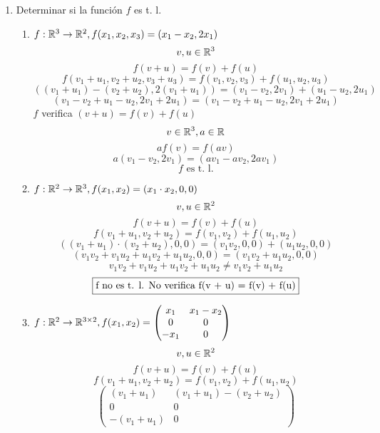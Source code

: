 \documentclass[../practica.root.tex]{subfiles}
\begin{document}
\begin{enumerate}
    \item Determinar si la función $f$ es t. l.
          \begin{enumerate}
              \item \( f: \mathbb{R}^3 \to \mathbb{R}^2, f(x_1, x_2, x_3) = (x_1 - x_2, 2x_1) \)
                    \[ v, u \in \mathbb{R}^3 \]
                    \[ f(v + u) = f(v) + f(u) \]
                    \[ f(v_1 + u_1,v_2 + u_2,v_3 + u_3) = f(v_1,v_2,v_3) + f(u_1,u_2,u_3) \]
                    \[ ((v_1 + u_1) - (v_2 + u_2), 2(v_1 + u_1)) = (v_1 - v_2, 2v_1) + (u_1 - u_2, 2u_1) \]
                    \[ (v_1 - v_2 + u_1 - u_2, 2v_1 + 2u_1) = (v_1 - v_2 + u_1 - u_2, 2v_1 + 2u_1) \]
                    $f$ verifica $(v + u) = f(v) + f(u)$
                    \[ v \in \mathbb{R}^3, a \in \mathbb{R} \]
                    \[ af(v) = f(av) \]
                    \[ a(v_1 - v_2, 2v_1) = (av_1 - av_2, 2av_1) \]
                    \[ \boxed{f \text{ es t. l.}} \]
              \item \( f: \mathbb{R}^2 \to \mathbb{R}^3, f(x_1,x_2) = (x_1\cdot x_2,0,0) \)
                    \[ v, u \in \mathbb{R}^2 \]
                    \[ f(v + u) = f(v) + f(u) \]
                    \[ f(v_1 + u_1, v_2 + u_2) = f(v_1, v_2) + f(u_1, u_2) \]
                    \[ ((v_1 + u_1)\cdot(v_2 + u_2),0,0) = (v_1v_2,0,0) + (u_1u_2,0,0) \]
                    \[ (v_1v_2 + v_1u_2 + u_1v_2 + u_1u_2,0,0) = (v_1v_2 + u_1u_2,0,0) \]
                    \[ v_1v_2 + v_1u_2 + u_1v_2 + u_1u_2 \neq v_1v_2 + u_1u_2 \]
                    \[ \boxed{$f$ \text{ no es t. l. No verifica } $f(v + u) = f(v) + f(u)$} \]
              \item \( f: \mathbb{R}^2 \to \mathbb{R}^{3\times2}, f(x_1,x_2) =
                    \begin{pmatrix}
                        x_1  & x_1 - x_2 \\
                        0    & 0         \\
                        -x_1 & 0
                    \end{pmatrix}
                    \)
                    \[ v, u \in \mathbb{R}^2 \]
                    \[ f(v + u) = f(v) + f(u) \]
                    \[ f(v_1 + u_1, v_2 + u_2) = f(v_1, v_2) + f(u_1, u_2) \]
                    \[
                        \begin{pmatrix}
                            (v_1 + u_1)  & (v_1 + u_1) - (v_2 + u_2) \\
                            0            & 0                         \\
                            -(v_1 + u_1) & 0

\end{pmatrix}\]
\end{enumerate}
\end{enumerate}
\end{document}
